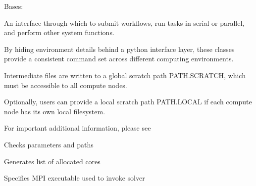 \documentclass[letterpaper,10pt,english]{sphinxmanual}
\begin{document}
\begin{fulllineitems}
\label{\detokenize{ref/seisflows.system:seisflows.system.pbs_sm.pbs_lg}}
Bases: {\hyperref[\detokenize{ref/seisflows.system:seisflows.system.base.base}]{}}

An interface through which to submit workflows, run tasks in serial or
parallel, and perform other system functions.

By hiding environment details behind a python interface layer, these
classes provide a consistent command set across different computing
environments.

Intermediate files are written to a global scratch path PATH.SCRATCH,
which must be accessible to all compute nodes.

Optionally, users can provide a local scratch path PATH.LOCAL if each
compute node has its own local filesystem.

For important additional information, please see

\begin{fulllineitems}
\label{\detokenize{ref/seisflows.system:seisflows.system.pbs_sm.pbs_lg.check}}
Checks parameters and paths

\end{fulllineitems}


\begin{fulllineitems}
\label{\detokenize{ref/seisflows.system:seisflows.system.pbs_sm.pbs_lg.hostlist}}
Generates list of allocated cores

\end{fulllineitems}


\begin{fulllineitems}
\label{\detokenize{ref/seisflows.system:seisflows.system.pbs_sm.pbs_lg.mpiexec}}
Specifies MPI executable used to invoke solver


\end{fulllineitems}
\end{fulllineitems}
\end{document}
